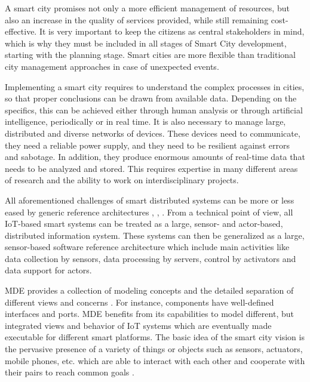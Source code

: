 A smart city promises not only a more efficient management of resources, but also an increase in the quality of services provided, while still remaining cost-effective. It is very important to keep the citizens as central stakeholders in mind, which is why they must be included in all stages of Smart City development, starting with the planning stage. Smart cities are more flexible than traditional city management approaches in case of unexpected events.

Implementing a smart city requires to understand the complex processes in cities, so that proper conclusions can be drawn from available data. Depending on the specifics, this can be achieved either through human analysis or through artificial intelligence, periodically or in real time. It is also necessary to manage large, distributed and diverse networks of devices. These devices need to communicate, they need a reliable power supply, and they need to be resilient against errors and sabotage. In addition, they produce enormous amounts of real-time data that needs to be analyzed and stored. This requires expertise in many different areas of research and the ability to work on interdisciplinary projects.

All aforementioned challenges of smart distributed systems can be more or less eased by generic reference architectures \cite{Fleurey+2011}, \citep{Gubbi+2013}, \cite{KateuleWinter2018}. From a technical point of view, all IoT-based smart systems can be treated as a large, sensor- and actor-based, distributed information system. These systems can then be generalized as a large, sensor-based software reference architecture \cite{KateuleWinter2018} which include main activities like data collection by sensors, data processing by servers, control by activators and data support for actors.

MDE provides a collection of modeling concepts and the detailed separation of different views and concerns \cite{KateuleWinter2018}. For instance, components have well-defined interfaces and ports. MDE benefits from its capabilities to model different, but integrated views and behavior of IoT systems which are eventually made executable for different smart platforms. The basic idea of the smart city vision is the pervasive presence of a variety of things or objects such as sensors, actuators, mobile phones, etc. which are able to interact with each other and cooperate with their pairs to reach common goals \cite{Atzori+2010} \cite{WeberRomana2010}.